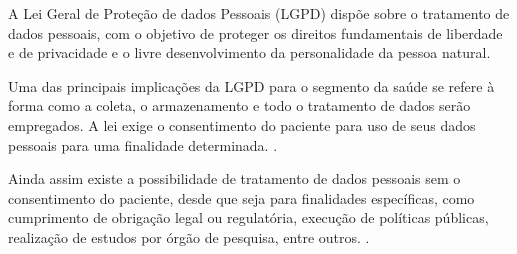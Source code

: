 A Lei Geral de Proteção de dados Pessoais (LGPD) dispõe sobre o
tratamento de dados pessoais, com o objetivo de proteger os direitos
fundamentais de liberdade e de privacidade e o livre desenvolvimento
da personalidade da pessoa natural. \cite{LGPD}

Uma das principais implicações da LGPD para o segmento da saúde se
refere à forma como a coleta,
o armazenamento e todo o tratamento de dados serão empregados. A lei
exige o consentimento do paciente para
uso de seus dados pessoais para uma finalidade determinada.
\cite{LGPD-Saude}.

Ainda assim existe a possibilidade de tratamento de dados pessoais
sem o consentimento do paciente, desde que seja para finalidades
específicas, como cumprimento de obrigação legal ou regulatória,
execução de políticas públicas, realização de estudos por órgão de
pesquisa, entre outros. \cite{LGPD-Saude}.
